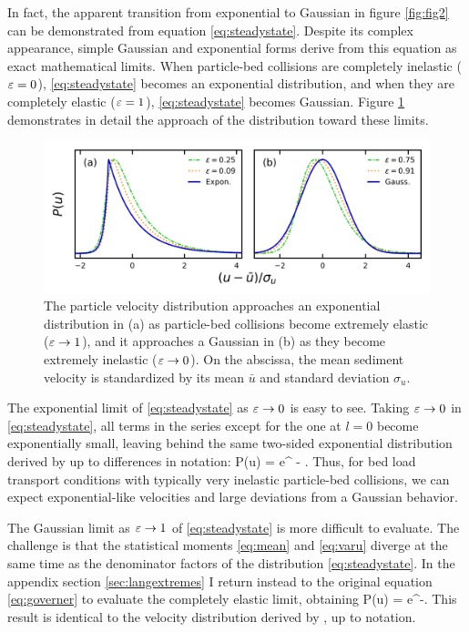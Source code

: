 In fact, the apparent transition from exponential to Gaussian in figure \ref{fig:fig2} can be demonstrated from equation \ref{eq:steadystate}. Despite its complex appearance, simple Gaussian and exponential forms derive from this equation as exact mathematical limits.
When particle-bed collisions are completely inelastic ($\varepsilon = 0$), \ref{eq:steadystate} becomes an exponential distribution, and when they are completely elastic ($\varepsilon = 1$), \ref{eq:steadystate} becomes Gaussian.
Figure \ref{fig:fig3} demonstrates in detail the approach of the distribution toward these limits.
\begin{figure}
	\centerline{\includegraphics{./figures/ch5/Fig3asymptotic.png}}
	\caption{The particle velocity distribution approaches an exponential distribution in (a) as particle-bed collisions become extremely elastic ($\varepsilon \rightarrow 1$), and it approaches a Gaussian in (b) as they become extremely inelastic ($\varepsilon \rightarrow 0$). On the abscissa, the mean sediment velocity is standardized by its mean $\bar{u}$ and standard deviation $\sigma_u$. }
	\label{fig:fig3}
\end{figure}

The exponential limit of \ref{eq:steadystate} as $\varepsilon \rightarrow 0$ is easy to see. Taking $\varepsilon \rightarrow 0 $ in \ref{eq:steadystate}, all terms in the series except for the one at $l=0$ become exponentially small, leaving behind the same two-sided exponential distribution derived by \cite{Fan2014} up to differences in notation:
\be P(u) = e^{ - }. \ee
Thus, for bed load transport conditions with typically very inelastic particle-bed collisions, we can expect exponential-like velocities and large deviations from a Gaussian behavior.

The Gaussian limit as $\varepsilon \rightarrow 1$ of \ref{eq:steadystate} is more difficult to evaluate. The challenge is that the statistical moments \ref{eq:mean} and \ref{eq:varu} diverge at the same time as the denominator factors of the distribution \ref{eq:steadystate}. In the appendix section \ref{sec:langextremes} I return instead to the original equation \ref{eq:governer} to evaluate the completely elastic limit, obtaining
\be P(u) = e^{-}. \label{eq:gaussian}\ee
This result is identical to the velocity distribution derived by \citet{Ancey2014}, up to notation.

